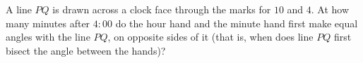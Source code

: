 A line $PQ$ is drawn across a clock face through the marks for $10$ and $4$. At how many minutes after $4{:}00$ do the hour hand and the minute hand first make equal angles with the line $PQ$, on opposite sides of it (that is, when does line $PQ$ first bisect the angle between the hands)?
